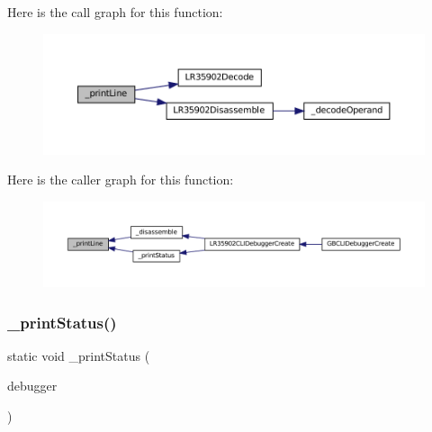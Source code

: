 Here is the call graph for this function\+:
\nopagebreak
\begin{figure}[H]
\begin{center}
\leavevmode
\includegraphics[width=350pt]{lr35902_2debugger_2cli-debugger_8c_a565a93fd2698bb6df9b06c322025a6cc_cgraph}
\end{center}
\end{figure}
Here is the caller graph for this function\+:
\nopagebreak
\begin{figure}[H]
\begin{center}
\leavevmode
\includegraphics[width=350pt]{lr35902_2debugger_2cli-debugger_8c_a565a93fd2698bb6df9b06c322025a6cc_icgraph}
\end{center}
\end{figure}
\mbox{\label{lr35902_2debugger_2cli-debugger_8c_a1bce4490785068fd42fca65db1fb21ad}} 
\subsubsection{\texorpdfstring{\+\_\+print\+Status()}{\_printStatus()}}
{\footnotesize\ttfamily static void \+\_\+print\+Status (\begin{DoxyParamCaption}\item[{struct C\+L\+I\+Debugger\+System $\ast$}]{debugger }\end{DoxyParamCaption})\hspace{0.3cm}{\ttfamily [static]}}

